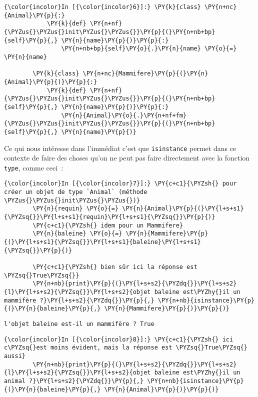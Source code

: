     \begin{Verbatim}[commandchars=\\\{\}]
{\color{incolor}In [{\color{incolor}6}]:} \PY{k}{class} \PY{n+nc}{Animal}\PY{p}{:}
            \PY{k}{def} \PY{n+nf}{\PYZus{}\PYZus{}init\PYZus{}\PYZus{}}\PY{p}{(}\PY{n+nb+bp}{self}\PY{p}{,} \PY{n}{name}\PY{p}{)}\PY{p}{:}
                \PY{n+nb+bp}{self}\PY{o}{.}\PY{n}{name} \PY{o}{=} \PY{n}{name}
        
        \PY{k}{class} \PY{n+nc}{Mammifere}\PY{p}{(}\PY{n}{Animal}\PY{p}{)}\PY{p}{:}
            \PY{k}{def} \PY{n+nf}{\PYZus{}\PYZus{}init\PYZus{}\PYZus{}}\PY{p}{(}\PY{n+nb+bp}{self}\PY{p}{,} \PY{n}{name}\PY{p}{)}\PY{p}{:}
                \PY{n}{Animal}\PY{o}{.}\PY{n+nf+fm}{\PYZus{}\PYZus{}init\PYZus{}\PYZus{}}\PY{p}{(}\PY{n+nb+bp}{self}\PY{p}{,} \PY{n}{name}\PY{p}{)}
\end{Verbatim}


    Ce qui nous intéresse dans l'immédiat c'est que \texttt{isinstance}
permet dans ce contexte de faire des choses qu'on ne peut pas faire
directement avec la fonction \texttt{type}, comme ceci~:

    \begin{Verbatim}[commandchars=\\\{\}]
{\color{incolor}In [{\color{incolor}7}]:} \PY{c+c1}{\PYZsh{} pour créer un objet de type `Animal` (méthode \PYZus{}\PYZus{}init\PYZus{}\PYZus{})}
        \PY{n}{requin} \PY{o}{=} \PY{n}{Animal}\PY{p}{(}\PY{l+s+s1}{\PYZsq{}}\PY{l+s+s1}{requin}\PY{l+s+s1}{\PYZsq{}}\PY{p}{)}
        \PY{c+c1}{\PYZsh{} idem pour un Mammifere}
        \PY{n}{baleine} \PY{o}{=} \PY{n}{Mammifere}\PY{p}{(}\PY{l+s+s1}{\PYZsq{}}\PY{l+s+s1}{baleine}\PY{l+s+s1}{\PYZsq{}}\PY{p}{)}
        
        \PY{c+c1}{\PYZsh{} bien sûr ici la réponse est \PYZsq{}True\PYZsq{}}
        \PY{n+nb}{print}\PY{p}{(}\PY{l+s+s2}{\PYZdq{}}\PY{l+s+s2}{l}\PY{l+s+s2}{\PYZsq{}}\PY{l+s+s2}{objet baleine est\PYZhy{}il un mammifère ?}\PY{l+s+s2}{\PYZdq{}}\PY{p}{,} \PY{n+nb}{isinstance}\PY{p}{(}\PY{n}{baleine}\PY{p}{,} \PY{n}{Mammifere}\PY{p}{)}\PY{p}{)}
\end{Verbatim}


    \begin{Verbatim}[commandchars=\\\{\}]
l'objet baleine est-il un mammifère ? True

    \end{Verbatim}

    \begin{Verbatim}[commandchars=\\\{\}]
{\color{incolor}In [{\color{incolor}8}]:} \PY{c+c1}{\PYZsh{} ici c\PYZsq{}est moins évident, mais la réponse est \PYZsq{}True\PYZsq{} aussi}
        \PY{n+nb}{print}\PY{p}{(}\PY{l+s+s2}{\PYZdq{}}\PY{l+s+s2}{l}\PY{l+s+s2}{\PYZsq{}}\PY{l+s+s2}{objet baleine est\PYZhy{}il un animal ?}\PY{l+s+s2}{\PYZdq{}}\PY{p}{,} \PY{n+nb}{isinstance}\PY{p}{(}\PY{n}{baleine}\PY{p}{,} \PY{n}{Animal}\PY{p}{)}\PY{p}{)}
\end{Verbatim}


